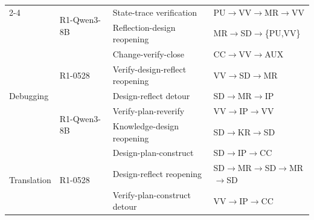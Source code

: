 \begin{table}[t]
\begin{threeparttable}
\begin{tabular}{llll}
\cmidrule(lr){2-4}

& \multirow{2}{*}{R1-Qwen3-8B} &
State-trace verification &PU$\rightarrow$VV$\rightarrow$MR$\rightarrow$VV\\
& & \cellcolor{gray!15}Reflection-design reopening &\cellcolor{gray!15}MR$\rightarrow$SD$\rightarrow$\{PU,VV\}\\

% 
% 
\midrule

\multirow{5}{*}{Debugging}
& \multirow{3}{*}{R1-0528} &
Change-verify-close & CC$\rightarrow$VV$\rightarrow$AUX\\
& & \cellcolor{gray!15}Verify-design-reflect reopening &\cellcolor{gray!15}VV$\rightarrow$SD$\rightarrow$MR\\
& & \cellcolor{gray!15}Design-reflect detour &\cellcolor{gray!15}SD$\rightarrow$MR$\rightarrow$IP\\

\cmidrule(lr){2-4}

& \multirow{2}{*}{R1-Qwen3-8B} &
Verify-plan-reverify & VV$\rightarrow$IP$\rightarrow$VV\\
& & \cellcolor{gray!15}Knowledge-design reopening &\cellcolor{gray!15}SD$\rightarrow$KR$\rightarrow$SD\\

% 
% 
\midrule

\multirow{6}{*}{Translation}
& \multirow{3}{*}{R1-0528} &
Design-plan-construct &SD$\rightarrow$IP$\rightarrow$CC\\
& & \cellcolor{gray!15}Design-reflect reopening &\cellcolor{gray!15}SD$\rightarrow$MR$\rightarrow$SD$\rightarrow$MR$\rightarrow$SD\\
& & \cellcolor{gray!15}Verify-plan-construct detour &\cellcolor{gray!15}VV$\rightarrow$IP$\rightarrow$CC\\


\end{tabular}
\end{threeparttable}
\end{table}
